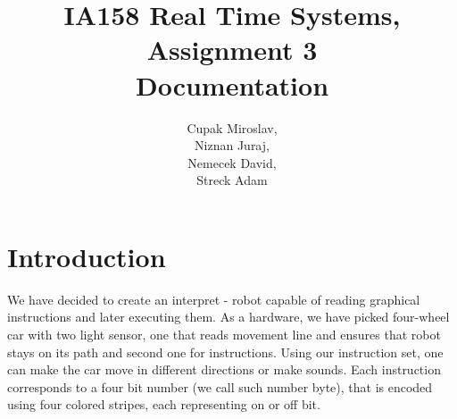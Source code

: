 \documentclass{article}
\title{IA158 Real Time Systems, Assignment 3 \\ Documentation}
\begin{document}
\author{Cupak Miroslav,\\
		Niznan Juraj, \\
        Nemecek David,\\
		Streck Adam}
\maketitle

\section{Introduction}
We have decided to create an interpret - robot capable of reading graphical instructions and later executing them. As a hardware, we have picked four-wheel car with two light sensor, one that reads movement line and ensures that robot stays on its path and second one for instructions. Using our instruction set, one can make the car move in different directions or make sounds. Each instruction corresponds to a four bit number (we call such number byte), that is encoded using four colored stripes, each representing on or off bit. 








\end{document}
